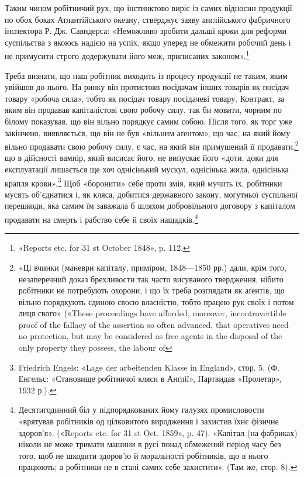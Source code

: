 Таким чином робітничий рух, що інстинктово виріс із самих
відносин продукції по обох боках Атлантійського океану, стверджує
заяву англійського фабричного інспектора Р. Дж. Савндерса:
«Неможливо зробити дальші кроки для реформи суспільства
з якоюсь надією на успіх, якщо уперед не обмежити робочий
день і не примусити строго додержувати його меж, приписаних
законом».\footnote{
«Reports etc. for 31 st October 1848», p. 112.
}

Треба визнати, що наш робітник виходить із процесу продукції
не таким, яким увійшов до нього. На ринку він протистояв
посідачам інших товарів як посідач товару «робоча сила», тобто
як посідач товару посідачеві товару. Контракт, за яким він продавав
капіталістові свою робочу силу, так би мовити, чорним по
білому показував, що він вільно порядкує самим собою. Після того,
як торг уже закінчено, виявляється, що він не був «вільним
аґентом», що час, на який йому вільно продавати свою робочу
силу, є час, на який він примушений її продавати,\footnote{
«Ці вчинки (маневри капіталу, приміром, 1848—1850 рр.) дали,
крім того, незаперечний доказ брехливости так часто висуваного твердження,
нібито робітники не потребують охорони, і що їх треба розглядати
як аґентів, що вільно порядкують єдиною своєю власністю, тобто
працею рук своїх і потом лиця свого» («These proceedings bave afforded,
moreover, incontrovertible proof of the fallacy of the assertion so often
advanced, that operatives need no protection, but may be considered as
free agents in the disposal of the only property they possess, the labour of
} що в дійсності
вампір, який висисає його, не випускає його «доти, доки для
експлуатації лишається ще хоч однісінький мускул, однісінька
жила, однісінька крапля крови».\footnote{
Friedrich Engels: «Lage der arbeitenden Klasse in England»,
стор. 5. (Ф. Енгельс: «Становище робітничої кляси в Англії», Партвидав
«Пролетар», 1932 р.).
} Щоб «боронити» себе проти
змія, який мучить їх, робітники мусять об’єднатися і, як кляса,
добитися державного закону, могутньої суспільної перешкоди,
яка самим їм заважала б шляхом добровільного договору з капіталом
продавати на смерть і рабство себе й своїх нащадків.\footnote{
Десятигодинний біл у підпорядкованих йому галузях промисловости
«врятував робітників од цілковитого виродження і захистив їхнє
фізичне здоров’я». («Reports etc. for 31 st Oct. 1859», p. 47). «Капітал
(на фабриках) ніколи не може тримати машини в русі понад обмежений
період часу без того, щоб не шкодити здоров’ю й моральності робітників,
що в нього працюють; а робітники не в стані самих себе захистити».
(Там же, стор. 8).
}
